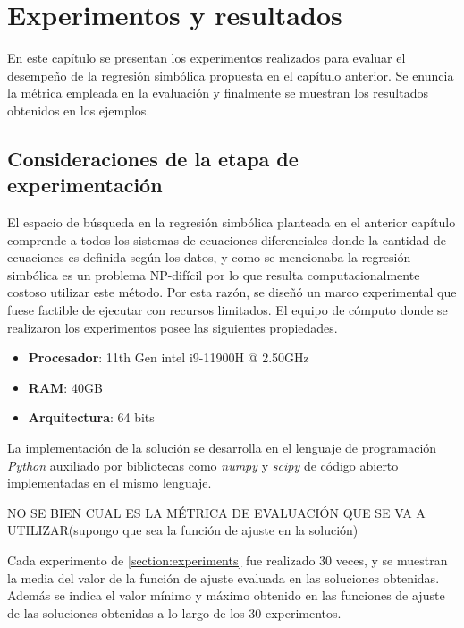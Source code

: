 \chapter{Experimentos y resultados}\label{chapter:results}

En este capítulo se presentan los experimentos realizados para evaluar el desempeño de la regresión simbólica propuesta en el capítulo anterior. Se enuncia la métrica empleada en la evaluación y finalmente se muestran los resultados obtenidos en los ejemplos.

\section{Consideraciones de la etapa de experimentación}\label{section:experimental_considerations}

El espacio de búsqueda en la regresión simbólica planteada en el anterior capítulo comprende a todos los sistemas de ecuaciones diferenciales donde la cantidad de ecuaciones es definida según los datos, y como se mencionaba la regresión simbólica es un problema NP-difícil por lo que resulta computacionalmente costoso utilizar este método. Por esta razón, se diseñó un marco experimental que fuese factible de ejecutar con recursos limitados. El equipo de cómputo donde se realizaron los experimentos posee las siguientes propiedades.


\begin{itemize}
    \item \textbf{Procesador}: 11th Gen intel i9-11900H @ 2.50GHz
    \item \textbf{RAM}: 40GB
    \item \textbf{Arquitectura}: 64 bits
\end{itemize}

La implementación de la solución se desarrolla en el lenguaje de programación \emph{Python} auxiliado por bibliotecas como \emph{numpy} y \emph{scipy} de código abierto implementadas en el mismo lenguaje.

NO SE BIEN CUAL ES LA MÉTRICA DE EVALUACIÓN QUE SE VA A UTILIZAR(supongo que sea la función de ajuste en la solución)

Cada experimento de \ref{section:experiments} fue realizado 30 veces, y se muestran la media del valor de la función de ajuste evaluada en las soluciones obtenidas. Además se indica el valor mínimo y máximo obtenido en las funciones de ajuste de las soluciones obtenidas a lo largo de los 30 experimentos.


